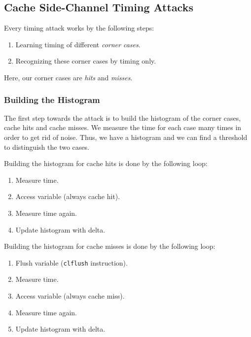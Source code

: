 \subsection{Cache Side-Channel Timing Attacks}
\label{subsec:cachesidechanneltiming}
Every timing attack works by the following steps:
\begin{enumerate}
    \item Learning timing of different \textit{corner cases}.
    \item Recognizing these corner cases by timing only.
\end{enumerate}
Here, our corner cases are \textit{hits} and \textit{misses}.

\subsubsection{Building the Histogram}
\label{subsubsec:buildingthehistogram}
The first step towards the attack is to build the histogram of the corner cases,
cache hits and cache misses. We measure the time for each case many times in
order to get rid of noise. Thus, we have a histogram and we can find a threshold
to distinguish the two cases.

\noindent Building the histogram for cache hits is done by the following loop:
\begin{enumerate}
    \item Measure time.
    \item Access variable (always cache hit).
    \item Measure time again.
    \item Update histogram with delta.
\end{enumerate}

\noindent Building the histogram for cache misses is done by the following loop:
\begin{enumerate}
    \item Flush variable (\texttt{clflush} instruction).
    \item Measure time.
    \item Access variable (always cache miss).
    \item Measure time again.
    \item Update histogram with delta.
\end{enumerate}

